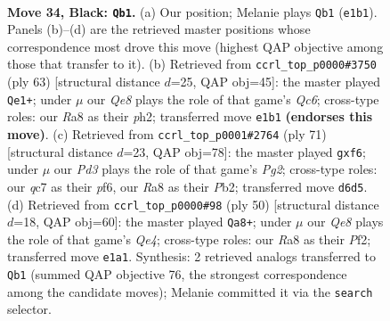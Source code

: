 \documentclass[11pt]{article}
\begin{document}
\clearpage

\begin{figure}[p]\centering
\begin{subfigure}{0.46\textwidth}\centering
\resizebox{\linewidth}{!}{%
\newchessgame
\chessboard[
  setfen={r7/2Q4p/3pkp2/8/pP6/6P1/P4PKP/4q3 b - - 4 34},
  showmover=false,
  pgfstyle=straightmove, color=movearrow, markmove={e1-b1}
]}
\caption{}
\end{subfigure}\hfill
\begin{subfigure}{0.46\textwidth}\centering
\resizebox{\linewidth}{!}{%
\newchessgame
\chessboard[
  setfen={8/Q4ppk/1p2p3/7p/1P6/2q3P1/P4P1P/6K1 b - - 0 32},
  showmover=false,
  pgfstyle=straightmove, color=movearrow, markmove={c3-e1}
]}
\caption{}
\end{subfigure}
\\[4pt]
\begin{subfigure}{0.46\textwidth}\centering
\resizebox{\linewidth}{!}{%
\newchessgame
\chessboard[
  setfen={5Q2/5ppk/5P2/3p3p/8/4P2P/1p1q1PPK/8 b - - 1 36},
  showmover=false,
  pgfstyle=straightmove, color=movearrow, markmove={g7-f6}
]}
\caption{}
\end{subfigure}\hfill
\begin{subfigure}{0.46\textwidth}\centering
\resizebox{\linewidth}{!}{%
\newchessgame
\chessboard[
  setfen={6k1/5p1p/p5p1/4p3/4Q3/7P/PP3PPK/q7 w - - 4 26},
  showmover=false,
  pgfstyle=straightmove, color=movearrow, markmove={e4-a8}
]}
\caption{}
\end{subfigure}
\caption{\textbf{Move 34, Black: \texttt{Qb1}.} (a) Our position; Melanie plays \texttt{Qb1} (\texttt{e1b1}). Panels (b)--(d) are the retrieved master positions whose correspondence most drove this move (highest QAP objective among those that transfer to it). (b) Retrieved from \texttt{ccrl\_top\_p0000\#3750} (ply 63) [structural distance $d$=25, QAP obj=45]: the master played \texttt{Qe1+}; under $\mu$ our \emph{Qe8} plays the role of that game's \emph{Qc6}; cross-type roles: our \emph{R}a8 as their \emph{p}h2; transferred move \texttt{e1b1} \textbf{(endorses this move)}. (c) Retrieved from \texttt{ccrl\_top\_p0001\#2764} (ply 71) [structural distance $d$=23, QAP obj=78]: the master played \texttt{gxf6}; under $\mu$ our \emph{Pd3} plays the role of that game's \emph{Pg2}; cross-type roles: our \emph{q}c7 as their \emph{p}f6, our \emph{R}a8 as their \emph{P}b2; transferred move \texttt{d6d5}. (d) Retrieved from \texttt{ccrl\_top\_p0000\#98} (ply 50) [structural distance $d$=18, QAP obj=60]: the master played \texttt{Qa8+}; under $\mu$ our \emph{Qe8} plays the role of that game's \emph{Qe4}; cross-type roles: our \emph{R}a8 as their \emph{P}f2; transferred move \texttt{e1a1}. Synthesis: 2 retrieved analogs transferred to \texttt{Qb1} (summed QAP objective 76, the strongest correspondence among the candidate moves); Melanie committed it via the \texttt{search} selector.}
\label{fig:thought-m67}
\end{figure}
\end{document}
